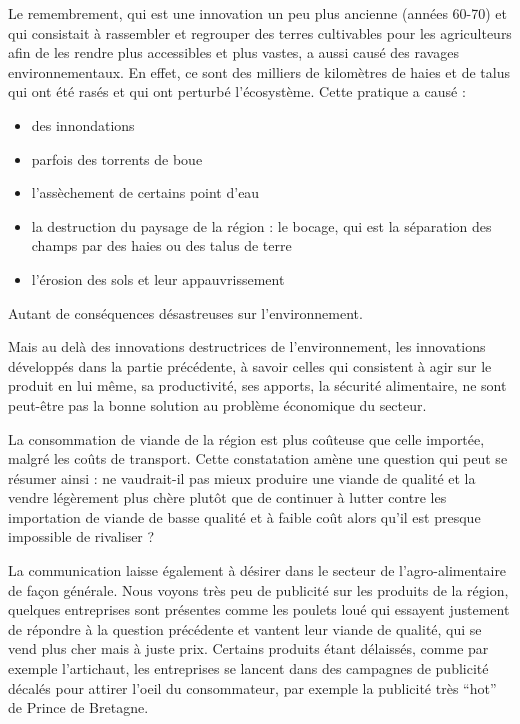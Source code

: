 \documentclass[a4paper,12pt]{report}
\begin{document}
			
			Le remembrement, qui est une innovation un peu plus ancienne (années 60-70) et qui consistait à rassembler et regrouper des terres cultivables pour les agriculteurs afin de les rendre plus accessibles et plus vastes, a aussi causé des ravages environnementaux. En effet, ce sont des milliers de kilomètres de haies et de talus qui ont été rasés et qui ont perturbé l’écosystème. Cette pratique a causé :
			\begin{itemize}
				\item des innondations
				\item parfois des torrents de boue
				\item l’assèchement de certains point d’eau
				\item la destruction du paysage de la région : le bocage, qui est la séparation des champs par des haies ou des talus de terre
				\item l’érosion des sols et leur appauvrissement
			\end{itemize}
			
			Autant de conséquences désastreuses sur l’environnement.	
			
			Mais au delà des innovations destructrices de l’environnement, les innovations développés dans la partie précédente, à savoir celles qui consistent à agir sur le produit en lui même, sa productivité, ses apports, la sécurité alimentaire, ne sont peut-être pas la bonne solution au problème économique du secteur.
			
			La consommation de viande de la région est plus coûteuse que celle importée, malgré les coûts de transport. Cette constatation amène une question qui peut se résumer ainsi : ne vaudrait-il pas mieux produire une viande de qualité et la vendre légèrement plus chère plutôt que de continuer à lutter contre les importation de viande de basse qualité et à faible coût alors qu’il est presque impossible de rivaliser ?
			
			La communication laisse également à désirer dans le secteur de l’agro-alimentaire de façon générale. Nous voyons très peu de publicité sur les produits de la région, quelques entreprises sont présentes comme les poulets loué qui essayent justement de répondre à la question précédente et vantent leur viande de qualité, qui se vend plus cher mais à juste prix.
			Certains produits étant délaissés, comme par exemple l’artichaut, les entreprises se lancent dans des campagnes de publicité décalés pour attirer l’oeil du consommateur, par exemple la publicité très “hot” de Prince de Bretagne.
			
\end{document}
